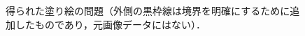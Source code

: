 \documentclass[dvipdfmx]{jsarticle}
\begin{document}
\begin{figure}[t]
\centering
{}
\caption{得られた塗り絵の問題（外側の黒枠線は境界を明確にするために追加したものであり，元画像データにはない）．}
\label{fig:question}
\end{figure}

%
%
\end{document}
